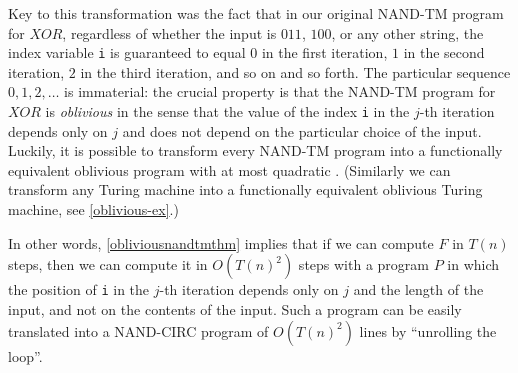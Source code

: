 Key to this transformation was the fact that in our original NAND-TM
program for \(\ensuremath{\mathit{XOR}}\), regardless of whether the
input is \(011\), \(100\), or any other string, the index variable
\texttt{i} is guaranteed to equal \(0\) in the first iteration, \(1\) in
the second iteration, \(2\) in the third iteration, and so on and so
forth. The particular sequence \(0,1,2,\ldots\) is immaterial: the
crucial property is that the NAND-TM program for
\(\ensuremath{\mathit{XOR}}\) is \emph{oblivious} in the sense that the
value of the index \texttt{i} in the \(j\)-th iteration depends only on
\(j\) and does not depend on the particular choice of the input.
Luckily, it is possible to transform every NAND-TM program into a
functionally equivalent oblivious program with at most quadratic .
(Similarly we can transform any Turing machine into a functionally
equivalent oblivious Turing machine, see \cref{oblivious-ex}.)

\hypertarget{obliviousnandtmthm}{}

In other words, \cref{obliviousnandtmthm} implies that if we can compute
\(F\) in \(T(n)\) steps, then we can compute it in \(O(T(n)^2)\) steps
with a program \(P\) in which the position of \texttt{i} in the \(j\)-th
iteration depends only on \(j\) and the length of the input, and not on
the contents of the input. Such a program can be easily translated into
a NAND-CIRC program of \(O(T(n)^2)\) lines by ``unrolling the loop''.



